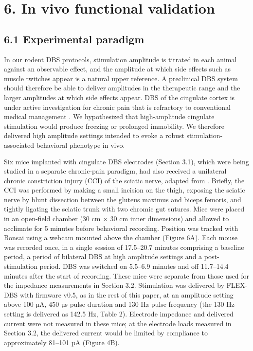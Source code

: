 \section{6. In vivo functional validation}\label{in-vivo-functional-validation}

\subsection{6.1 Experimental paradigm}\label{experimental-paradigm}

In our rodent DBS protocols, stimulation amplitude is titrated in each animal against an observable effect, and the amplitude at which side effects such as muscle twitches appear is a natural upper reference. A preclinical DBS system should therefore be able to deliver amplitudes in the therapeutic range and the larger amplitudes at which side effects appear. DBS of the cingulate cortex is under active investigation for chronic pain that is refractory to conventional medical management \citep{boccard2017,shirvalkar2025}. We hypothesized that high-amplitude cingulate stimulation would produce freezing or prolonged immobility. We therefore delivered high amplitude settings intended to evoke a robust stimulation-associated behavioral phenotype in vivo.

Six mice implanted with cingulate DBS electrodes (Section 3.1), which were being studied in a separate chronic-pain paradigm, had also received a unilateral chronic constriction injury (CCI) of the sciatic nerve, adapted from \citet{bennett1988}. Briefly, the CCI was performed by making a small incision on the thigh, exposing the sciatic nerve by blunt dissection between the gluteus maximus and biceps femoris, and tightly ligating the sciatic trunk with two chromic gut sutures. Mice were placed in an open-field chamber (30 cm × 30 cm inner dimensions) and allowed to acclimate for 5 minutes before behavioral recording. Position was tracked with Bonsai \citep{lopes2015} using a webcam mounted above the chamber (Figure 6A). Each mouse was recorded once, in a single session of 17.5--20.7 minutes comprising a baseline period, a period of bilateral DBS at high amplitude settings and a post-stimulation period. DBS was switched on 5.5--6.9 minutes and off 11.7--14.4 minutes after the start of recording. These mice were separate from those used for the impedance measurements in Section 3.2. Stimulation was delivered by FLEX-DBS with firmware v0.5, as in the rest of this paper, at an amplitude setting above 100 µA, 450 µs pulse duration and 130 Hz pulse frequency (the 130 Hz setting is delivered as 142.5 Hz, Table 2). Electrode impedance and delivered current were not measured in these mice; at the electrode loads measured in Section 3.2, the delivered current would be limited by compliance to approximately 81--101 µA (Figure 4B).

